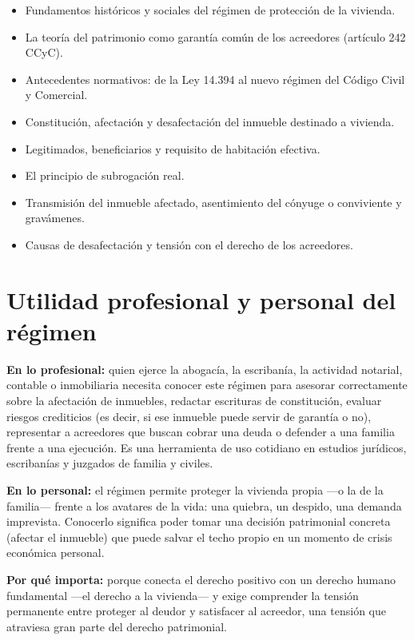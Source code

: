 \documentclass[12pt,oneside]{book}
\begin{document}
\begin{itemize}
    \item Fundamentos hist\'oricos y sociales del r\'egimen de protecci\'on de la vivienda.
    \item La teor\'ia del patrimonio como garant\'ia com\'un de los acreedores (art\'iculo 242 CCyC).
    \item Antecedentes normativos: de la Ley 14.394 al nuevo r\'egimen del C\'odigo Civil y Comercial.
    \item Constituci\'on, afectaci\'on y desafectaci\'on del inmueble destinado a vivienda.
    \item Legitimados, beneficiarios y requisito de habitaci\'on efectiva.
    \item El principio de subrogaci\'on real.
    \item Transmisi\'on del inmueble afectado, asentimiento del c\'onyuge o conviviente y grav\'amenes.
    \item Causas de desafectaci\'on y tensi\'on con el derecho de los acreedores.
\end{itemize}

\section{Utilidad profesional y personal del r\'egimen}

\textbf{En lo profesional:} quien ejerce la abogac\'ia, la escriban\'ia, la actividad notarial, contable o inmobiliaria necesita conocer este r\'egimen para asesorar correctamente sobre la afectaci\'on de inmuebles, redactar escrituras de constituci\'on, evaluar riesgos crediticios (es decir, si ese inmueble puede servir de garant\'ia o no), representar a acreedores que buscan cobrar una deuda o defender a una familia frente a una ejecuci\'on. Es una herramienta de uso cotidiano en estudios jur\'idicos, escriban\'ias y juzgados de familia y civiles.

\textbf{En lo personal:} el r\'egimen permite proteger la vivienda propia ---o la de la familia--- frente a los avatares de la vida: una quiebra, un despido, una demanda imprevista. Conocerlo significa poder tomar una decisi\'on patrimonial concreta (afectar el inmueble) que puede salvar el techo propio en un momento de crisis econ\'omica personal.

\textbf{Por qu\'e importa:} porque conecta el derecho positivo con un derecho humano fundamental ---el derecho a la vivienda--- y exige comprender la tensi\'on permanente entre proteger al deudor y satisfacer al acreedor, una tensi\'on que atraviesa gran parte del derecho patrimonial.
\end{document}
